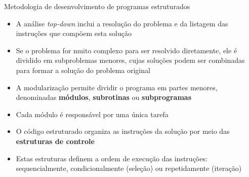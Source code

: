 \begin{frame}[fragile]{Metodologia de desenvolvimento de programas estruturados}

    \begin{itemize}
        \item A análise \textit{top-down} inclui a resolução do problema e da listagem das 
            instruções que compõem esta solução

        \item Se o problema for muito complexo para ser resolvido diretamente, ele é dividido em
            subproblemas menores, cujas soluções podem ser combinadas para formar a solução do
            problema original

        \item A modularização permite dividir o programa em partes menores, denominadas 
            \textbf{módulos}, \textbf{subrotinas} ou \textbf{subprogramas}

        \item Cada módulo é responsável por uma única tarefa

        \item O código estruturado organiza as instruções da solução por meio das 
            \textbf{estruturas de controle}

        \item Estas estruturas definem a ordem de execução das instruções: sequencialmente, 
            condicionalmente (seleção) ou repetidamente (iteração)
    \end{itemize}

\end{frame}

